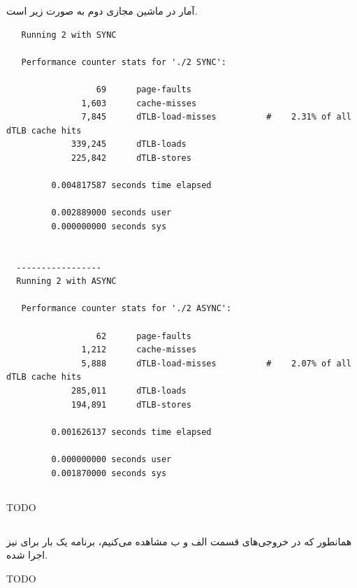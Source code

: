 \documentclass{article}
\begin{document}
آمار در ماشین مجازی دوم به صورت زیر است.
\begin{latin}
\begin{lstlisting}
   Running 2 with SYNC

   Performance counter stats for './2 SYNC':
  
                  69      page-faults                                                 
               1,603      cache-misses                                                
               7,845      dTLB-load-misses          #    2.31% of all dTLB cache hits 
             339,245      dTLB-loads                                                  
             225,842      dTLB-stores                                                 
  
         0.004817587 seconds time elapsed
  
         0.002889000 seconds user
         0.000000000 seconds sys
  
  
  -----------------
  Running 2 with ASYNC
  
   Performance counter stats for './2 ASYNC':
  
                  62      page-faults                                                 
               1,212      cache-misses                                                
               5,888      dTLB-load-misses          #    2.07% of all dTLB cache hits 
             285,011      dTLB-loads                                                  
             194,891      dTLB-stores                                                 
  
         0.001626137 seconds time elapsed
  
         0.000000000 seconds user
         0.001870000 seconds sys
\end{lstlisting}
\end{latin}

\subsection{}
TODO

\subsection{}
همانطور که در خروجی‌های قسمت الف و ب مشاهده می‌کنیم،‌ برنامه یک بار 
برای 
نیز اجرا شده. 

TODO

\section{}
\end{document}
